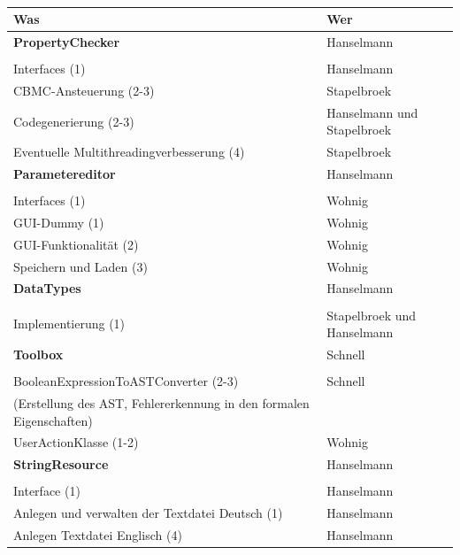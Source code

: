 \documentclass[a4paper]{scrreprt}
\begin{document}
\\
\begin{tabular}{ | p{7cm} | p{7cm} |}
	\hline
	Was & Wer\\
	\hline
	
	\rule{0pt}{15pt}\textbf {PropertyChecker} & Hanselmann\\
	&\\
	\hline
	Interfaces (1) & Hanselmann\\
	\hline
	CBMC-Ansteuerung (2-3) & Stapelbroek \\
	\hline
	Codegenerierung (2-3) & Hanselmann und Stapelbroek \\
	\hline
	Eventuelle Multithreadingverbesserung (4) & Stapelbroek \\
	\hline
	
	\rule{0pt}{15pt}\textbf {Parametereditor} & Hanselmann \\
	&\\
	\hline
	Interfaces (1) & Wohnig\\
	\hline
	GUI-Dummy (1) & Wohnig\\
	\hline
	GUI-Funktionalität (2) & Wohnig\\
	\hline
	Speichern und Laden (3) & Wohnig\\
	\hline
	
	\rule{0pt}{15pt}\textbf {DataTypes} & Hanselmann\\
	&\\
	\hline
	Implementierung (1) & Stapelbroek und Hanselmann\\
	\hline	
	
	\rule{0pt}{15pt}\textbf {Toolbox} & Schnell\\
	&\\
	\hline	
	BooleanExpressionToASTConverter (2-3)  & Schnell\\
	(Erstellung des AST, Fehlererkennung in den formalen Eigenschaften) &\\
	\hline
	UserActionKlasse (1-2) & Wohnig\\
	\hline
	
	\rule{0pt}{15pt}\textbf {StringResource} & Hanselmann\\
	&\\
	\hline	
	Interface (1) & Hanselmann \\
	\hline
	Anlegen und verwalten der Textdatei Deutsch (1) & Hanselmann \\
	\hline
	Anlegen Textdatei Englisch (4) & Hanselmann \\
	\hline
	
	
	

\end{tabular}
\end{document}

